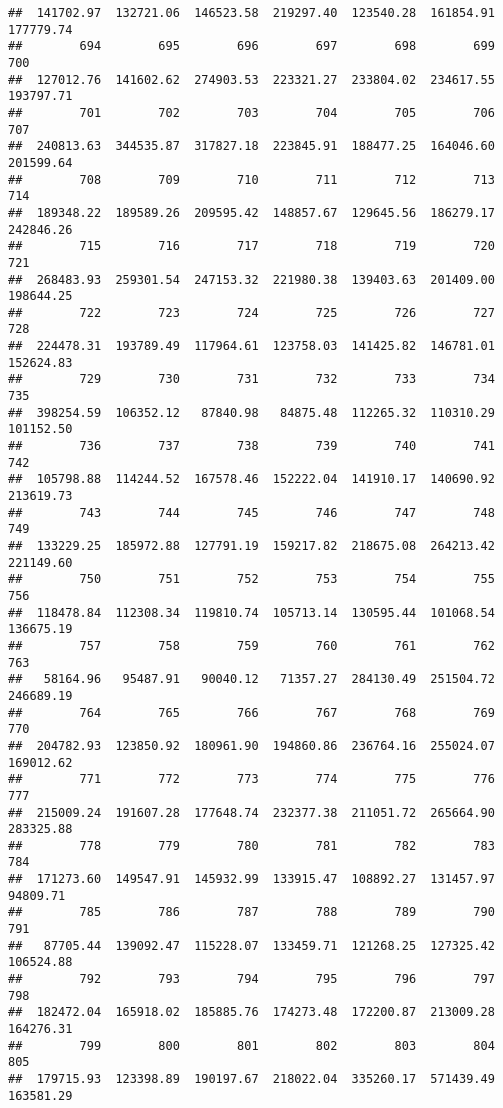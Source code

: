 \documentclass[
]{article}
\begin{document}
\begin{verbatim}
##  141702.97  132721.06  146523.58  219297.40  123540.28  161854.91  177779.74 
##        694        695        696        697        698        699        700 
##  127012.76  141602.62  274903.53  223321.27  233804.02  234617.55  193797.71 
##        701        702        703        704        705        706        707 
##  240813.63  344535.87  317827.18  223845.91  188477.25  164046.60  201599.64 
##        708        709        710        711        712        713        714 
##  189348.22  189589.26  209595.42  148857.67  129645.56  186279.17  242846.26 
##        715        716        717        718        719        720        721 
##  268483.93  259301.54  247153.32  221980.38  139403.63  201409.00  198644.25 
##        722        723        724        725        726        727        728 
##  224478.31  193789.49  117964.61  123758.03  141425.82  146781.01  152624.83 
##        729        730        731        732        733        734        735 
##  398254.59  106352.12   87840.98   84875.48  112265.32  110310.29  101152.50 
##        736        737        738        739        740        741        742 
##  105798.88  114244.52  167578.46  152222.04  141910.17  140690.92  213619.73 
##        743        744        745        746        747        748        749 
##  133229.25  185972.88  127791.19  159217.82  218675.08  264213.42  221149.60 
##        750        751        752        753        754        755        756 
##  118478.84  112308.34  119810.74  105713.14  130595.44  101068.54  136675.19 
##        757        758        759        760        761        762        763 
##   58164.96   95487.91   90040.12   71357.27  284130.49  251504.72  246689.19 
##        764        765        766        767        768        769        770 
##  204782.93  123850.92  180961.90  194860.86  236764.16  255024.07  169012.62 
##        771        772        773        774        775        776        777 
##  215009.24  191607.28  177648.74  232377.38  211051.72  265664.90  283325.88 
##        778        779        780        781        782        783        784 
##  171273.60  149547.91  145932.99  133915.47  108892.27  131457.97   94809.71 
##        785        786        787        788        789        790        791 
##   87705.44  139092.47  115228.07  133459.71  121268.25  127325.42  106524.88 
##        792        793        794        795        796        797        798 
##  182472.04  165918.02  185885.76  174273.48  172200.87  213009.28  164276.31 
##        799        800        801        802        803        804        805 
##  179715.93  123398.89  190197.67  218022.04  335260.17  571439.49  163581.29 

\end{verbatim}
\end{document}

